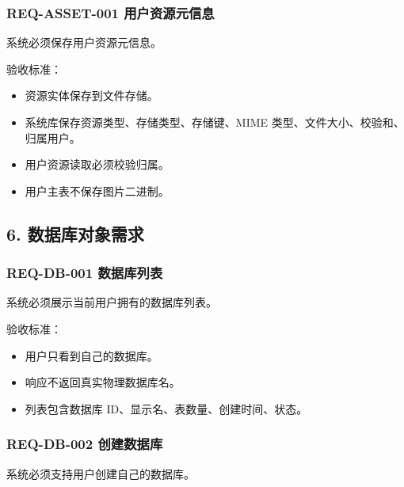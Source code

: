 \documentclass[
  a4paper,
  UTF8]{ctexart}
\providecommand{\tightlist}{%
  \setlength{\itemsep}{0pt}\setlength{\parskip}{0pt}}
\begin{document}
\hypertarget{req-asset-001-ux7528ux6237ux8d44ux6e90ux5143ux4fe1ux606f}{%
\subsubsection{REQ-ASSET-001
用户资源元信息}\label{req-asset-001-ux7528ux6237ux8d44ux6e90ux5143ux4fe1ux606f}}

系统必须保存用户资源元信息。

验收标准：

\begin{itemize}
\tightlist
\item
  资源实体保存到文件存储。
\item
  系统库保存资源类型、存储类型、存储键、MIME
  类型、文件大小、校验和、归属用户。
\item
  用户资源读取必须校验归属。
\item
  用户主表不保存图片二进制。
\end{itemize}

\hypertarget{ux6570ux636eux5e93ux5bf9ux8c61ux9700ux6c42}{%
\subsection{6.
数据库对象需求}\label{ux6570ux636eux5e93ux5bf9ux8c61ux9700ux6c42}}

\hypertarget{req-db-001-ux6570ux636eux5e93ux5217ux8868}{%
\subsubsection{REQ-DB-001
数据库列表}\label{req-db-001-ux6570ux636eux5e93ux5217ux8868}}

系统必须展示当前用户拥有的数据库列表。

验收标准：

\begin{itemize}
\tightlist
\item
  用户只看到自己的数据库。
\item
  响应不返回真实物理数据库名。
\item
  列表包含数据库 ID、显示名、表数量、创建时间、状态。
\end{itemize}

\hypertarget{req-db-002-ux521bux5efaux6570ux636eux5e93}{%
\subsubsection{REQ-DB-002
创建数据库}\label{req-db-002-ux521bux5efaux6570ux636eux5e93}}

系统必须支持用户创建自己的数据库。
\end{document}
